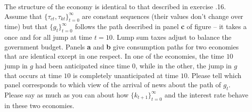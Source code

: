 \medskip
\noindent
 The structure of the  economy is identical to that described in exercise \the\chapternum.16.
Assume that $\{\tau_{ct}, \tau_{kt}\}_{t=0}^\infty $ are  constant sequences (their values don't change over time) but that $\{g_t\}_{t=0}^\infty$ follows the path described in panel {\bf c}
of figure   -- it takes a once and for all jump at time $t=10$. Lump sum taxes adjust to balance the government budget.   Panels {\bf a} and {\bf b} give consumption paths for two economies that are identical except in one respect.
In one of the economies, the time $10$ jump in $g$ had been anticipated since time $0$, while in the other, the jump in $g$ that occurs at time $10$ is completely unanticipated at time $10$.
Please tell which panel corresponds to which view of the arrival of news about the path of $g_t$. Please say as much as you can about how $\{k_{t+1}\}_{t=0}^\infty$ and the interest rate behave in these two economies.
%
%




